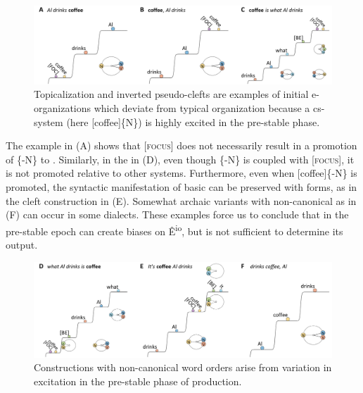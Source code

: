   
\begin{figure}
\includegraphics[width=\textwidth]{figures/Tilsen-img78.png}
\caption{Topicalization and inverted pseudo-clefts are examples of initial e-organizations which deviate from typical organization because a cs-system (here [coffee]\{N\}) is highly excited in the pre-stable phase.}
\label{fig:4:28}
\end{figure}
 

  The example in {}(A) shows that [\textsc{focus}] does not necessarily result in a promotion of \{-N\} to . Similarly, in the  in (D), even though \{-N\} is coupled with [\textsc{focus}], it is not promoted relative to other systems. Furthermore, even when [coffee]\{-N\} is promoted, the syntactic manifestation of basic  can be preserved with  forms, as in the cleft construction in {}(E). Somewhat archaic variants with non-canonical  as in (F) can occur in some dialects. These examples force us to conclude that  in the pre-stable epoch can create biases on Ê\textsuperscript{io}, but  is not sufficient to determine its output. 

  
\begin{figure}
\includegraphics[width=\textwidth]{figures/Tilsen-img79.png}
\caption{Constructions with non-canonical word orders arise from variation in excitation in the pre-stable phase of production.}
\label{fig:4:29}
\end{figure}
 

